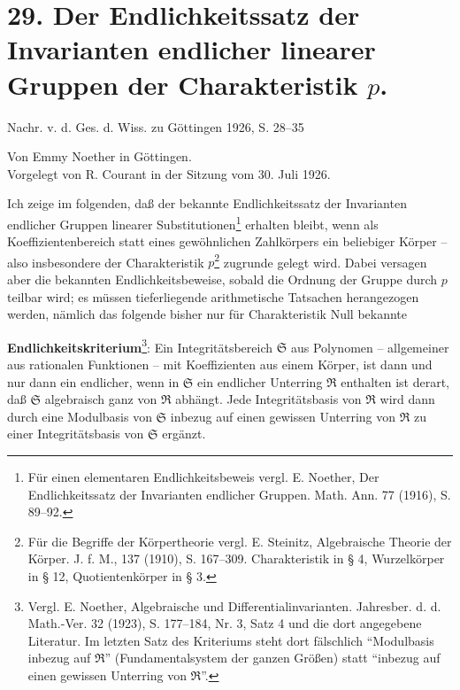 \section*{29. Der Endlichkeitssatz der Invarianten endlicher linearer Gruppen der Charakteristik $p$.}

\begin{center}
Nachr. v. d. Ges. d. Wiss. zu Göttingen 1926, S. 28--35
\end{center}

\setcounter{footnote}{0}

\begin{center}
Von Emmy Noether in Göttingen.\\[0.5em]
Vorgelegt von R. Courant in der Sitzung vom 30. Juli 1926.
\end{center}

Ich zeige im folgenden, daß der bekannte Endlichkeitssatz der Invarianten endlicher Gruppen linearer Substitutionen\footnote{Für einen elementaren Endlichkeitsbeweis vergl. E. Noether, Der Endlichkeitssatz der Invarianten endlicher Gruppen. Math. Ann. 77 (1916), S. 89--92.} erhalten bleibt, wenn als Koeffizientenbereich statt eines gewöhnlichen Zahlkörpers ein beliebiger Körper -- also insbesondere der Charakteristik $p$\footnote{Für die Begriffe der Körpertheorie vergl. E. Steinitz, Algebraische Theorie der Körper. J. f. M., 137 (1910), S. 167--309. Charakteristik in § 4, Wurzelkörper in § 12, Quotientenkörper in § 3.} zugrunde gelegt wird. Dabei versagen aber die bekannten Endlichkeitsbeweise, sobald die Ordnung der Gruppe durch $p$ teilbar wird; es müssen tieferliegende arithmetische Tatsachen herangezogen werden, nämlich das folgende bisher nur für Charakteristik Null bekannte

\textbf{Endlichkeitskriterium}\footnote{Vergl. E. Noether, Algebraische und Differentialinvarianten. Jahresber. d. d. Math.-Ver. 32 (1923), S. 177--184, Nr. 3, Satz 4 und die dort angegebene Literatur. Im letzten Satz des Kriteriums steht dort fälschlich ``Modulbasis inbezug auf $\mathfrak R$'' (Fundamentalsystem der ganzen Größen) statt ``inbezug auf einen gewissen Unterring von $\mathfrak R$''.}: Ein Integritätsbereich $\mathfrak S$ aus Polynomen -- allgemeiner aus rationalen Funktionen -- mit Koeffizienten aus einem Körper, ist dann und nur dann ein endlicher, wenn in $\mathfrak S$ ein endlicher Unterring $\mathfrak R$ enthalten ist derart, daß $\mathfrak S$ algebraisch ganz von $\mathfrak R$ abhängt. Jede Integritätsbasis von $\mathfrak R$ wird dann durch eine Modulbasis von $\mathfrak S$ inbezug auf einen gewissen Unterring von $\mathfrak R$ zu einer Integritätsbasis von $\mathfrak S$ ergänzt.

